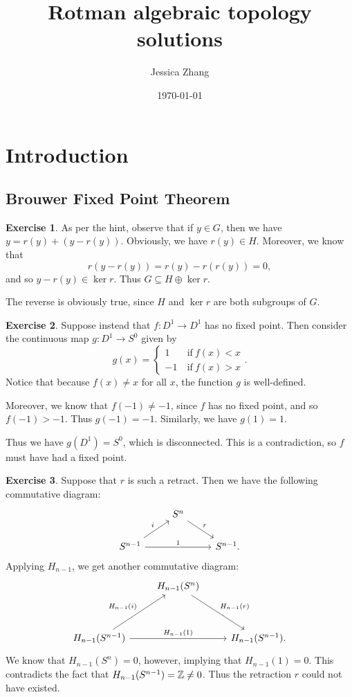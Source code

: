 \documentclass{article}
\title{Rotman algebraic topology solutions}
\author{Jessica Zhang}
\date{\today}
\theoremstyle{definition}
\newtheorem{intex}{Exercise}[section]
\newenvironment{exercise}{\begin{intex}\label{\theintex}}{\end{intex}}
\begin{document}
\maketitle

\section{Introduction} 
\subsection*{Brouwer Fixed Point Theorem} 
\begin{exercise}
As per the hint, observe that if $y\in G$, then we have $y=r(y)+(y-r(y))$. Obviously, we have $r(y)\in H$. Moreover, we know that \[r(y-r(y))=r(y)-r(r(y))=0,\] and so $y-r(y)\in\ker r$. Thus $G\subseteq H\oplus\ker r$. 

The reverse is obviously true, since $H$ and $\ker r$ are both subgroups of $G$. 
\end{exercise} 

\begin{exercise}
Suppose instead that $f:D^1\to D^1$ has no fixed point. Then consider the continuous map $g:D^1\to S^0$ given by \[g(x)=\begin{cases}1&~\text{if}~f(x)<x\\-1&~\text{if}~f(x)>x\end{cases}.\] Notice that because $f(x)\ne x$ for all $x$, the function $g$ is well-defined. 

Moreover, we know that $f(-1)\ne-1$, since $f$ has no fixed point, and so $f(-1)>-1$. Thus $g(-1)=-1$. Similarly, we have $g(1)=1$. 

Thus we have $g(D^1)=S^0$, which is disconnected. This is a contradiction, so $f$ must have had a fixed point. 
\end{exercise} 

\begin{exercise}
Suppose that $r$ is such a retract. Then we have the following commutative diagram: 
\[\begin{tikzcd}
&S^n\arrow[rd,"r"]&\\
S^{n-1}\arrow[ru,"i"]\arrow[rr,"1"]&&S^{n-1}. 
\end{tikzcd}\] 
Applying $H_{n-1}$, we get another commutative diagram: 
\[\begin{tikzcd}[row sep=huge] 
&H_{n-1}(S^n)\arrow[rd,"H_{n-1}(r)"]&\\
H_{n-1}(S^{n-1})\arrow[ru,"H_{n-1}(i)"]\arrow[rr,"H_{n-1}(1)"]&&H_{n-1}(S^{n-1}).
\end{tikzcd}\]
We know that $H_{n-1}(S^n)=0$, however, implying that $H_{n-1}(1)=0$. This contradicts the fact that $H_{n-1}(S^{n-1})=\mathbb{Z}\ne0$. Thus the retraction $r$ could not have existed. 
\end{exercise} 
\end{document}
